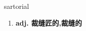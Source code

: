 
\begin{frame}
{\huge sartorial}
\begin{center}
\begin{enumerate}\Large
  \item \textbf{adj. 裁缝匠的,裁缝的}
\end{enumerate}
\end{center}
\end{frame}
